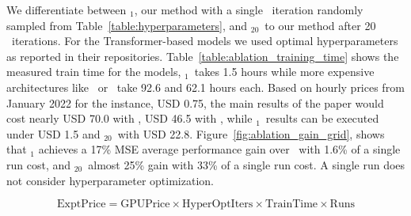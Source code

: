 We differentiate between \ours$_{1}$, our method with a single \HYPEROPT\ iteration randomly sampled from Table~\ref{table:hyperparameters}, and \ours$_{20}$\ to our method after 20 \HYPEROPT\ iterations. For the Transformer-based models we used optimal hyperparameters as reported in their repositories. Table~\ref{table:ablation_training_time} shows the measured train time for the models, \ours$_{1}$\ takes 1.5 hours while more expensive architectures like \Autoformer\ or \Informer\ take 92.6 and 62.1 hours each. Based on hourly prices from January 2022 for the  instance, USD 0.75, the main results of the paper would cost nearly USD 70.0 with \Autoformer, USD 46.5 with \Informer, while \ours$_{1}$\ results can be executed under USD 1.5 and \ours$_{20}$\ with USD 22.8. Figure~\ref{fig:ablation_gain_grid}, shows that \ours$_{1}$ achieves a 17\% MSE average performance gain over \Autoformer\ with 1.6\% of a single run cost, and \ours$_{20}$\ almost 25\% gain with 33\% of a single run cost. A single run does not consider hyperparameter optimization.

\begin{equation*}
    \text{ExptPrice} = \text{GPUPrice} \times \text{HyperOptIters} \times \text{TrainTime} \times \text{Runs} 
\end{equation*}


